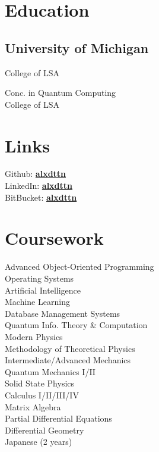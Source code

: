 \documentclass[letterpaper]{headers} %
\begin{document}

\begin{minipage}[t]{0.33\textwidth}
\section{Education}
	\subsection{University of Michigan}
		College of LSA \\

		\sectionspace
		
		Conc. in Quantum Computing \\
		College of LSA \\
\sectionspace

\section{Links}
	Github: \href{https://github.com/alxdttn}{\bf alxdttn}\\
	LinkedIn: \href{https://www.linkedin.com/in/alxdttn}{\bf alxdttn} \\
	BitBucket: \href{https://bitbucket.org/alxdttn}{\bf alxdttn}\\

\sectionspace

\section{Coursework}
	Advanced Object-Oriented Programming \\
	Operating Systems \\
	Artificial Intelligence \\
	Machine Learning \\
	Database Management Systems \\
	Quantum Info. Theory \& Computation \\
	Modern Physics \\
	Methodology of Theoretical Physics \\
	Intermediate/Advanced Mechanics \\
	Quantum Mechanics I/II \\
	Solid State Physics \\
	Calculus I/II/III/IV \\
	Matrix Algebra \\
	Partial Differential Equations \\
	Differential Geometry \\
	Japanese (2 years) \\
\sectionspace


\end{minipage}
\end{document}
